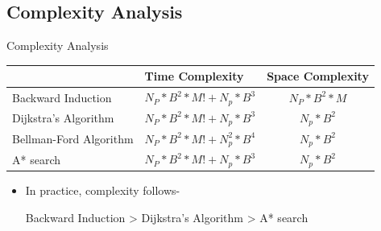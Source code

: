 \documentclass{beamer}
\begin{document}
\subsection{Complexity Analysis}
\begin{frame}{Complexity Analysis}
\begin{table}
\begin{tabular}{|p{2.5cm}|p{4cm}|c|}
\hline
 & \textbf{Time Complexity} & \textbf{Space Complexity} \\
\hline
Backward Induction & $N_P*B^{2}*M! + N_p*B^3$ & $N_P*B^{2}*M$ \\
\hline
Dijkstra's Algorithm & $N_P*B^{2}*M! + N_p*B^3$ & $N_p*B^2$ \\
\hline
Bellman-Ford Algorithm & $N_P*B^{2}*M! + N_p^2*B^4$ & $N_p*B^2$ \\
\hline
A* search & $N_P*B^{2}*M! + N_p*B^3$ & $N_p*B^2$ \\
\hline
\end{tabular}
\end{table}
\begin{itemize}
\item In practice, complexity follows-
\begin{center}
Backward Induction > Dijkstra's Algorithm > A* search
\end{center}
\end{itemize}
\end{frame}
\end{document}

